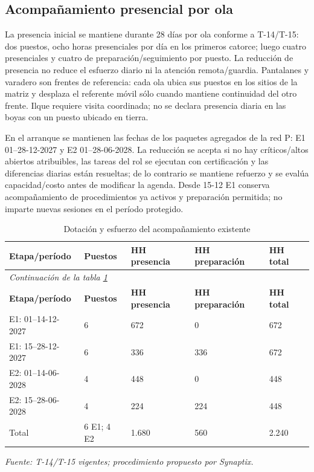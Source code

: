 \subsection{Acompañamiento presencial por ola}
La presencia inicial se mantiene durante 28 días por ola conforme a T-14/T-15: dos puestos, ocho horas presenciales por día en los primeros catorce; luego cuatro presenciales y cuatro de preparación/seguimiento por puesto. La reducción de presencia no reduce el esfuerzo diario ni la atención remota/guardia. Pantalanes y varadero son frentes de referencia: cada ola ubica sus puestos en los sitios de la matriz y desplaza el referente móvil sólo cuando mantiene continuidad del otro frente. Ilque requiere visita coordinada; no se declara presencia diaria en las boyas con un puesto ubicado en tierra.

En el arranque se mantienen las fechas de los paquetes agregados de la red P: E1 01--28-12-2027 y E2 01--28-06-2028. La reducción se acepta si no hay críticos/altos abiertos atribuibles, las tareas del rol se ejecutan con certificación y las diferencias diarias están resueltas; de lo contrario se mantiene refuerzo y se evalúa capacidad/costo antes de modificar la agenda. Desde 15-12 E1 conserva acompañamiento de procedimientos ya activos y preparación permitida; no imparte nuevas sesiones en el período protegido.

\begingroup\small\setlength{\tabcolsep}{3pt}
\begin{longtable}{p{}p{}p{}p{}p{}}
\caption{Dotación y esfuerzo del acompañamiento existente}\label{tab:t18-presencia}\\\hline
\textbf{Etapa/período} & \textbf{Puestos} & \textbf{HH presencia} & \textbf{HH preparación} & \textbf{HH total}\\\hline\endfirsthead
\multicolumn{5}{l}{\textit{Continuación de la tabla \ref{tab:t18-presencia}}}\\\hline
\textbf{Etapa/período} & \textbf{Puestos} & \textbf{HH presencia} & \textbf{HH preparación} & \textbf{HH total}\\\hline\endhead
\hline\endfoot\hline\endlastfoot
E1: 01--14-12-2027 & 6 & 672 & 0 & 672\\\hline
E1: 15--28-12-2027 & 6 & 336 & 336 & 672\\\hline
E2: 01--14-06-2028 & 4 & 448 & 0 & 448\\\hline
E2: 15--28-06-2028 & 4 & 224 & 224 & 448\\\hline
Total & 6 E1; 4 E2 & 1.680 & 560 & 2.240\\\hline
\end{longtable}\endgroup
\noindent\textit{Fuente: T-14/T-15 vigentes; procedimiento propuesto por Synaptix.}

